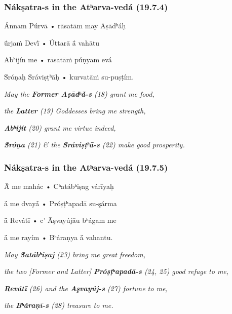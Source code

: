 \documentclass[pdf]{beamer}
\begin{document}
\begin{frame} \frametitle{Nákṣatra-s in the Atʰarva-vedá (19.7.4)}
\begin{center}
	Ánnam Pū́rvā • rāsatām may Aṣādʰā́ḥ

	ū́rjaṁ Devī́ • Úttarā ā́ vahātu

	Abʰijín me • rāsatāṁ púṇyam evá

	Ṡróṇaḥ Ṡráviṣṭʰāḥ • kurvatāṁ su-puṣṭím.

	\vspace{12pt}

	\textit{May the \textbf{Former Aṣādʰā́-s} (18) grant me food,}

	\textit{the \textbf{Latter} (19) Goddesses bring me strength,}

	\textit{\textbf{Abʰijít} (20) grant me virtue indeed,}

	\textit{\textbf{Ṡróṇa} (21) \& the \textbf{Ṡráviṣṭʰā-s} (22) make good prosperity.}
\end{center}
\end{frame}

\begin{frame} \frametitle{Nákṣatra-s in the Atʰarva-vedá (19.7.5)}
\begin{center}
	Ā́ me mahác • Cʰatábʰiṣag várīyaḥ

	ā́ me dvayā́ • Próṣṭʰapadā su-şárma

	ā́ Revátī • c’ Āşvayújāu bʰágam me

	ā́ me rayím •  Bʰáraṇya ā́ vahantu.

	\vspace{12pt}

	\textit{May \textbf{Ṡatábʰiṣaj} (23) bring me great freedom,}

	\textit{the two [Former and Latter] \textbf{Próṣṭʰapadā-s} (24, 25) good refuge to me,}

	\textit{\textbf{Revátī} (26) and the \textbf{Aşvayúj-s} (27) fortune to me,}

	\textit{the \textbf{Bʰáraṇī-s} (28) treasure to me.}
\end{center}
\end{frame}
\end{document}
